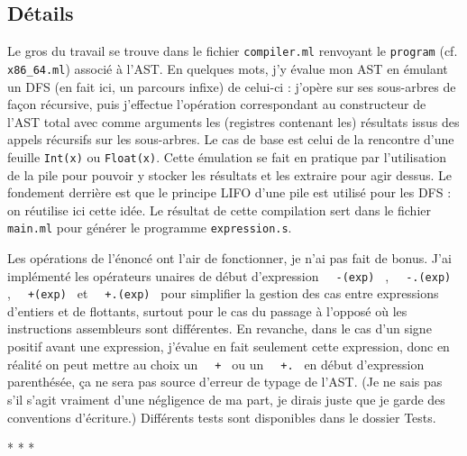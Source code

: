 \documentclass[12pt,french]{article}
\newcommand{\inlinecode}[1]{%
  \texttt{%
    \setlength{\spaceskip}{0.5em plus 1em minus 0.1em}%
    \ifdim\lastskip>0pt \unskip\hspace{0.5em plus 0.5em minus 0.1em}\fi
    #1
  }%
}
\begin{document}
\subsection{Détails}
Le gros du travail se trouve dans le fichier \texttt{compiler.ml} renvoyant le \texttt{program} (cf. \texttt{x86\_64.ml}) associé à l'AST. En quelques mots, j'y évalue mon AST en émulant un DFS (en fait ici, un parcours infixe) de celui-ci : j'opère sur ses sous-arbres de façon récursive, puis j'effectue l'opération correspondant au constructeur de l'AST total avec comme arguments les (registres contenant les) résultats issus des appels récursifs sur les sous-arbres. Le cas de base est celui de la rencontre d'une feuille \texttt{Int(x)} ou \texttt{Float(x)}. Cette émulation se fait en pratique par l'utilisation de la pile pour pouvoir y stocker les résultats et les extraire pour agir dessus. Le fondement derrière est que le principe LIFO d'une pile est utilisé pour les DFS : on réutilise ici cette idée. Le résultat de cette compilation sert dans le fichier \texttt{main.ml} pour générer le programme \texttt{expression.s}. \par
Les opérations de l'énoncé ont l'air de fonctionner, je n'ai pas fait de bonus. J'ai implémenté les opérateurs unaires de début d'expression \inlinecode{-(exp)}, \inlinecode{-.(exp)}, \inlinecode{+(exp)} et \inlinecode{+.(exp)} pour simplifier la gestion des cas entre expressions d'entiers et de flottants, surtout pour le cas du passage à l'opposé où les instructions assembleurs sont différentes. En revanche, dans le cas d'un signe positif avant une expression, j'évalue en fait seulement cette expression, donc en réalité on peut mettre au choix un \inlinecode{+} ou un \inlinecode{+.} en début d'expression parenthésée, ça ne sera pas source d'erreur de typage de l'AST. (Je ne sais pas s'il s'agit vraiment d'une négligence de ma part, je dirais juste que je garde des conventions d'écriture.) Différents tests sont disponibles dans le dossier \textsf{Tests}.\newline
\newline
\begin{center}
    *  *  *
\end{center}
\end{document}
